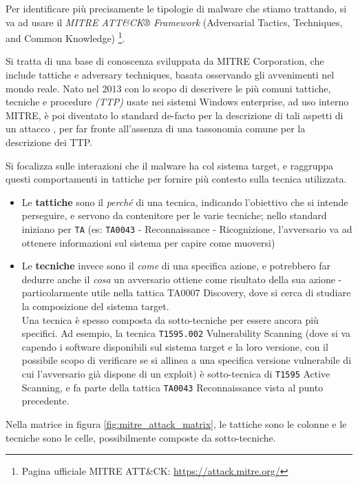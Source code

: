 Per identificare più precisamente le tipologie di malware che stiamo trattando, si va ad usare il \emph{MITRE ATT\&CK® Framework} (Adversarial Tactics, Techniques, and Common Knowledge)
\footnote{Pagina ufficiale MITRE ATT\&CK: \url{https://attack.mitre.org/}}.

Si tratta di una base di conoscenza sviluppata da MITRE Corporation, che include tattiche e adversary techniques, basata osservando gli avvenimenti nel mondo reale. Nato nel 2013 con lo scopo di descrivere le più comuni tattiche, tecniche e procedure \emph{(TTP)} usate nei sistemi Windows enterprise, ad uso interno MITRE, è poi diventato lo standard de-facto per la descrizione di tali aspetti di un attacco
\cite{mitre_attack_framework_introduction}, per far fronte all'assenza di una tassonomia comune per la descrizione dei TTP.

Si focalizza sulle interazioni che il malware ha col sistema target, e raggruppa questi comportamenti in tattiche per fornire più contesto sulla tecnica utilizzata.
\begin{itemize}
    \item Le \textbf{tattiche} sono il \emph{perché} di una tecnica, indicando l'obiettivo che si intende perseguire, e servono da contenitore per le varie tecniche; nello standard iniziano per \texttt{TA} (es: \texttt{TA0043} - Reconnaissance - Ricognizione, l'avversario va ad ottenere informazioni sul sistema per capire come muoversi)
    \item Le \textbf{tecniche} invece sono il \emph{come} di una specifica azione, e potrebbero far dedurre anche il \emph{cosa} un avversario ottiene come risultato della sua azione - particolarmente utile nella tattica TA0007 Discovery, dove si cerca di studiare la composizione del sistema target. \\
    Una tecnica è spesso composta da sotto-tecniche per essere ancora più specifici.
    Ad esempio, la tecnica \texttt{T1595.002} Vulnerability Scanning (dove si va capendo i software disponibili sul sistema target e la loro versione, con il possibile scopo di verificare se si allinea a una specifica versione vulnerabile di cui l'avversario già dispone di un exploit) è sotto-tecnica di \texttt{T1595} Active Scanning, e fa parte della tattica \texttt{TA0043} Reconnaissance vista al punto precedente.
\end{itemize}

Nella matrice in figura \ref{fig:mitre_attack_matrix}, le tattiche sono le colonne e le tecniche sono le celle, possibilmente composte da sotto-tecniche.

